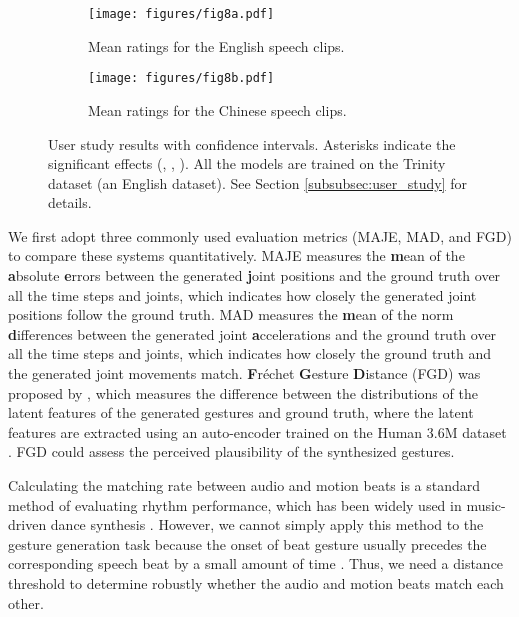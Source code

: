 \documentclass[acmtog,authorversion]{acmart}
\begin{document}
\begin{figure*}[t]
    \centering
    \begin{subfigure}[t]{0.48\textwidth}
        \centering
        \texttt{[image: figures/fig8a.pdf]}
        \caption{Mean ratings for the English speech clips.}
        \label{fig:fig8a}
    \end{subfigure}
    \hspace{\fill}
    \begin{subfigure}[t]{0.48\textwidth}
        \centering
        \texttt{[image: figures/fig8b.pdf]}
        \caption{Mean ratings for the Chinese speech clips.}
        \label{fig:fig8b}
    \end{subfigure}
    \caption{User study results with  confidence intervals. Asterisks indicate the significant effects (, , ). All the models are trained on the Trinity dataset (an English dataset). See Section \ref{subsubsec:user_study} for details.}
    \Description{}
    \label{fig:fig8}
\end{figure*}

We first adopt three commonly used evaluation metrics (MAJE, MAD, and FGD) to compare these systems quantitatively. 
MAJE measures the \textbf{m}ean of the \textbf{a}bsolute \textbf{e}rrors between the generated \textbf{j}oint positions and the ground truth over all the time steps and joints, which indicates how closely the generated joint positions follow the ground truth. 
MAD measures the \textbf{m}ean of the  norm \textbf{d}ifferences between the generated joint \textbf{a}ccelerations and the ground truth over all the time steps and joints, which indicates how closely the ground truth and the generated joint movements match.
\textbf{F}r{\'e}chet \textbf{G}esture \textbf{D}istance (FGD) was proposed by \citet{yoon2020speech}, which measures the difference between the distributions of the latent features of the generated gestures and ground truth, where the latent features are extracted using an auto-encoder trained on the Human 3.6M dataset \cite{ionescu2013human3}. FGD could assess the perceived plausibility of the synthesized gestures.  

Calculating the matching rate between audio and motion beats is a standard method of evaluating rhythm performance, which has been widely used in music-driven dance synthesis \cite{Li_2021_aist, chen2021choreomaster}. However, we cannot simply apply this method to the gesture generation task because the onset of beat gesture usually precedes the corresponding speech beat by a small amount of time \cite{pouw2019quantifying}. Thus, we need a distance threshold to determine robustly whether the audio and motion beats match each other. 
\end{document}
